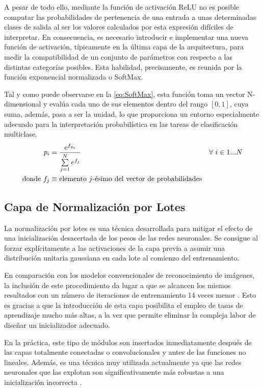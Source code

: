 A pesar de todo ello, mediante la función de activación ReLU no es posible computar las probabilidades de pertenencia de una entrada a unas determinadas clases de salida al ser los valores calculados por esta expresión difíciles de interpretar. En consecuencia, es necesario introducir e implementar una nueva función de activación, típicamente en la última capa de la arquitectura, para medir la compatibilidad de un conjunto de parámetros con respecto a las distintas categorías posibles. Esta habilidad, precisamente, es reunida por la función exponencial normalizada o SoftMax.

Tal y como puede observarse en la \autoref{eq:SoftMax}, esta función toma un vector N-dimensional y evalúa cada uno de sus elementos dentro del rango $[0, 1]$, cuya suma, además, pasa a ser la unidad, lo que proporciona un entorno especialmente adecuado para la interpretación probabilística en las tareas de clasificación multiclase.
\begin{align} \label{eq:SoftMax}
    p_i &= \frac{e^{f_{y_i}}}{\sum\limits_{j=1}^{N} e^{f_j}} & \forall \text{\space} i \in \text{$1$...$N$} \\
    \text{donde}~ 
    f_j &\equiv \text{elemento $j$-ésimo del vector de probabilidades} \notag
\end{align}

\subsection{Capa de Normalización por Lotes}

La normalización por lotes es una técnica desarrollada para mitigar el efecto de una inicialización desacertada de los pesos de las redes neuronales. Se consigue al forzar explícitamente a las activaciones de la capa previa a asumir una distribución unitaria gaussiana en cada lote al comienzo del entrenamiento.

En comparación con los modelos convencionales de reconocimiento de imágenes, la inclusión de este procedimiento da lugar a que se alcancen los mismos resultados con un número de iteraciones de entrenamiento 14 veces menor \cite{BatchNormalization}. Esto es gracias a que la introducción de esta capa posibilita el empleo de tasas de aprendizaje mucho más altas, a la vez que permite eliminar la compleja labor de diseñar un inicializador adecuado.

En la práctica, este tipo de módulos son insertados inmediatamente después de las capas totalmente conectadas o convolucionales y antes de las funciones no lineales. Además, es una técnica muy utilizada actualmente ya que las redes neuronales que las explotan son significativamente más robustas a una inicialización incorrecta \cite{CS231n}.


